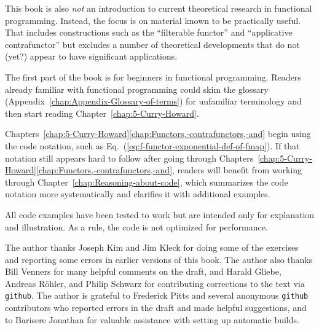 This book is also \emph{not} an introduction to current theoretical
research in functional programming. Instead, the focus is on material
known to be practically useful. That includes constructions such as
the \textsf{``}filterable functor\textsf{''} and \textsf{``}applicative contrafunctor\textsf{''} but
excludes a number of theoretical developments that do not (yet?) appear
to have significant applications.

The first part of the book is for beginners in functional programming.
Readers already familiar with functional programming could skim the
glossary (Appendix~\ref{chap:Appendix-Glossary-of-terms}) for unfamiliar
terminology and then start reading Chapter~\ref{chap:5-Curry-Howard}.

Chapters~\ref{chap:5-Curry-Howard}\textendash \ref{chap:Functors,-contrafunctors,-and}
begin using the code notation, such as Eq.~(\ref{eq:f-functor-exponential-def-of-fmap}).
If that notation still appears hard to follow after going through
Chapters~\ref{chap:5-Curry-Howard}\textendash \ref{chap:Functors,-contrafunctors,-and},
readers will benefit from working through Chapter~\ref{chap:Reasoning-about-code},
which summarizes the code notation more systematically and clarifies
it with additional examples.

All code examples have been tested to work but are intended only for
explanation and illustration. As a rule, the code is not optimized
for performance.

The author thanks Joseph Kim and Jim Kleck for doing some of the exercises
and reporting some errors in earlier versions of this book. The author
also thanks Bill Venners for many helpful comments on the draft, and
Harald Gliebe, Andreas R\"ohler, and Philip Schwarz for contributing
corrections to the text via \texttt{github}. The author is grateful
to Frederick Pitts and several anonymous \texttt{github} contributors
who reported errors in the draft and made helpful suggestions, and
to Barisere Jonathan for valuable assistance with setting up automatic
builds.

